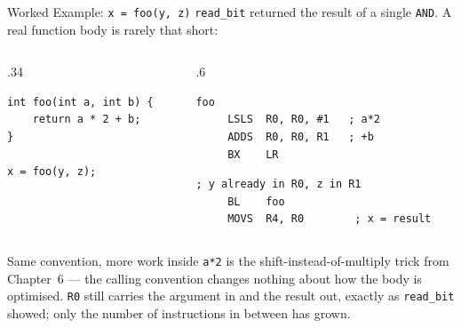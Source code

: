 \documentclass[9pt,aspectratio=169,xcolor=table]{beamer}
\begin{document}
\begin{frame}[fragile]{Worked Example: \texttt{x = foo(y, z)}}
    \leavevmode
    {\small \texttt{read\_bit} returned the result of a single \texttt{AND}.
    A real function body is rarely that short:}

    \vspace{1mm}
    \begin{columns}[T]
    \begin{column}{.34\textwidth}
        \begin{lstlisting}[style=myc, basicstyle=\normalsize\ttfamily]
int foo(int a, int b) {
    return a * 2 + b;
}

x = foo(y, z);
        \end{lstlisting}
    \end{column}
    \begin{column}{.6\textwidth}
        \begin{lstlisting}[style=armasm, language=ARM, basicstyle=\normalsize\ttfamily]
foo
     LSLS  R0, R0, #1   ; a*2
     ADDS  R0, R0, R1   ; +b
     BX    LR
        \end{lstlisting}

        \vspace{2mm}
        \begin{lstlisting}[style=armasm, language=ARM, basicstyle=\normalsize\ttfamily]
; y already in R0, z in R1
     BL    foo
     MOVS  R4, R0        ; x = result
        \end{lstlisting}
    \end{column}
    \end{columns}

    \vspace{3mm}
\begin{block}{Same convention, more work inside} \texttt{a*2} is the shift-instead-of-multiply trick from Chapter~6 --- the calling convention changes nothing about how the body is optimised. \texttt{R0} still carries the argument in and the result out, exactly as \texttt{read\_bit} showed; only the number of instructions in between has grown. \end{block}
\end{frame}
\end{document}
